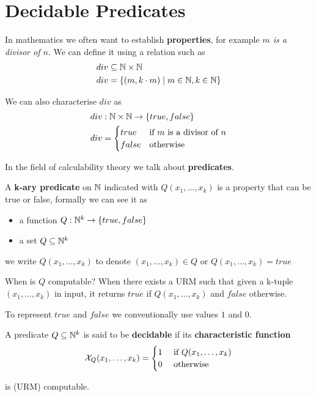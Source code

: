 \chapter{Decidable Predicates}

In mathematics we often want to establish \textbf{properties}, for example \emph{$m$ is a divisor of $n$}. 
We can define it using a relation such as
\begin{align*}
    div & \subseteq \mathbb{N} \times \mathbb{N}\\
    div & = \{(m,k \cdot m) \mid m \in \mathbb{N}, k \in \mathbb{N} \}
\end{align*}

We can also characterise $div$ as 
\begin{align*}
    div & : \mathbb{N} \times \mathbb{N} \rightarrow \{true, false\}\\
    div & = \begin{cases}
                true & \mbox{if $m$ is a divisor of $n$}\\
                false & \mbox{otherwise}
            \end{cases}
\end{align*}

In the field of calculability theory we talk about \textbf{predicates}.

A \textbf{k-ary predicate} on $\mathbb{N} $ indicated with $Q(x_1,\dots,x_k)$ is a property that can be true or false, formally we can see it as

\begin{itemize}
\item a function $Q: \mathbb{N}^k\rightarrow \{true,false\}$
\item a set $Q \subseteq \mathbb{N}^k$
\end{itemize}

we write $Q(x_1,\dots,x_k)$ to denote $(x_1,\dots,x_k) \in Q$ or $Q(x_1,\dots,x_k) = true$

When is $Q$ computable? When there exists a URM such that given a k-tuple $(x_1,\dots,x_k)$ in input, it returns $true$ if $Q(x_1,\dots,x_k)$ and $false$ otherwise. 

To represent $true$ and $false$ we conventionally use values $1$ and $0$.

\begin{definition}
    A predicate $Q \subseteq \mathbb{N}^k$ is said to be \textbf{decidable} if its \textbf{characteristic function}
\begin{equation*}
\mathcal{X}_Q(x_1,\dots,x_k) = \begin{cases}
1 & $ if $ Q(x_1,\dots,x_k) \\
0 & $ otherwise $
\end{cases}
\end{equation*}

is (URM) computable.
\end{definition}


